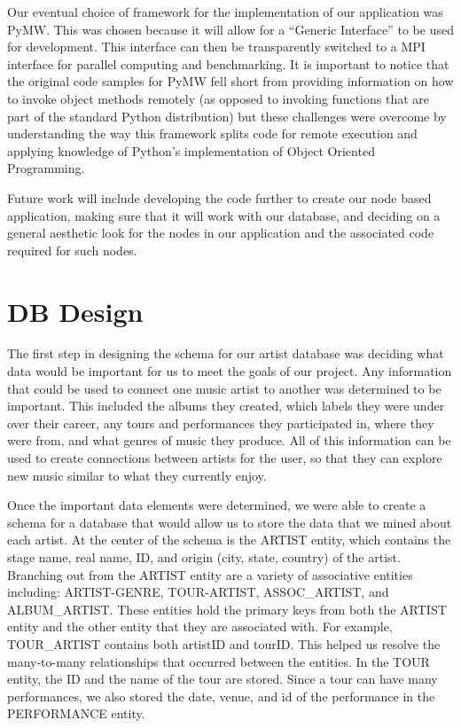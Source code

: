\documentclass{sig-alternate}
\begin{document}
Our eventual choice of framework for the implementation of our application was PyMW\cite {ieee5161132}. 
This was chosen because it will allow for a ``Generic Interface'' to be used for development. 
This interface can then be transparently switched to a MPI interface for parallel computing and 
benchmarking. It is important to notice that the original code samples for PyMW fell short from
providing information on how to invoke object methods remotely (as opposed to invoking functions
that are part of the standard Python distribution) but these challenges were overcome by
understanding the way this framework splits code for remote execution and applying knowledge
of Python's implementation of Object Oriented Programming.

Future work will include developing the code further to create our node based 
application, making sure that it will work with our database, and deciding on a general 
aesthetic look for the nodes in our application and the associated code required for such nodes. 

\section{DB Design}
\label{db design}

The first step in designing the schema for our artist database was deciding what data would be important
for us to meet the goals of our project. Any information that could be used to connect one music artist 
to another was determined to be important. This included the albums they created, which labels they were 
under over their career, any tours and performances they participated in, where they were from, and what 
genres of music they produce. All of this information can be used to create connections between artists for 
the user, so that they can explore new music similar to what they currently enjoy.

Once the important data elements were determined, we were able to create a schema for a database that would 
allow us to store the data that we mined about each artist. At the center of the schema is the ARTIST entity, 
which contains the stage name, real name, ID, and origin (city, state, country) of the artist. Branching out 
from the ARTIST entity are a variety of associative entities including: ARTIST-GENRE, TOUR-ARTIST, ASSOC_ARTIST, 
and ALBUM_ARTIST. These entities hold the primary keys from both the ARTIST entity and the other entity that 
they are associated with. For example, TOUR_ARTIST contains both artistID and tourID. This helped us resolve 
the many-to-many relationships that occurred between the entities. In the TOUR entity, the ID and the name of 
the tour are stored. Since a tour can have many performances, we also stored the date, venue, and id of the 
performance in the PERFORMANCE entity.
\end{document}
